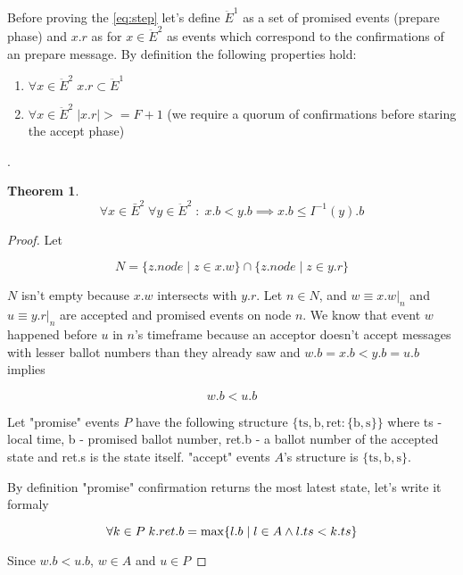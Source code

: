 \documentclass[12pt]{article}
\newtheorem{theorem}{Theorem}
\theoremstyle{definition}
\begin{document}
\begin{appendices}
Before proving the \ref{eq:step} let's define $\ddot{E}^1$ as a set of promised events (prepare phase) and $x.r$ as for $x \in \ddot{E}^2$ as events which correspond to the confirmations of an prepare message. By definition the following properties hold:
\begin{enumerate}
  \item $\forall x \in \ddot{E}^2 \; x.r \subset \ddot{E}^1$
  \item $\forall x \in \ddot{E}^2 \; |x.r| >= F+1$ (we require a quorum of confirmations before staring the accept phase)
\end{enumerate}.

\begin{theorem} \label{th:proof2}
  $$\forall x \in \bar{E}^2 \; \forall y \in \ddot{E}^2 \;:\; x.b < y.b \implies x.b \leq I^{-1}(y).b$$
\end{theorem}

\begin{proof}
  Let
  
  $$N = \{z.node \;|\; z \in x.w\} \cap \{z.node \;|\; z \in y.r\}$$

  $N$ isn't empty because $x.w$ intersects with $y.r$. Let $n \in N$, and $w \equiv x.w |_n$ and $u \equiv y.r |_n$ are accepted and promised events on node $n$. We know that event $w$ happened before $u$ in $n$'s timeframe because an acceptor doesn't accept messages with lesser ballot numbers than they already saw and $w.b = x.b < y.b = u.b$ implies

  \begin{equation}
    w.b < u.b
  \end{equation}

  Let "promise" events $P$ have the following structure $\{ \mbox{ts}, \mbox{b}, \mbox{ret} : \{ \mbox{b}, \mbox{s} \} \}$ where ts - local time, b - promised ballot number, ret.b - a ballot number of the accepted state and ret.s is the state itself. "accept" events $A$'s structure is  $\{ \mbox{ts}, \mbox{b}, \mbox{s} \}$.

  By definition "promise" confirmation returns the most latest state, let's write it formaly

  \begin{equation} \label{eq:last}
    \forall k \in P \; k.ret.b = \max \{ l.b \;|\;l \in A \land l.ts < k.ts \} \\
  \end{equation}

  Since $w.b < u.b$, $w \in A$ and $u \in P$


\end{proof}
\end{appendices}
\end{document}
